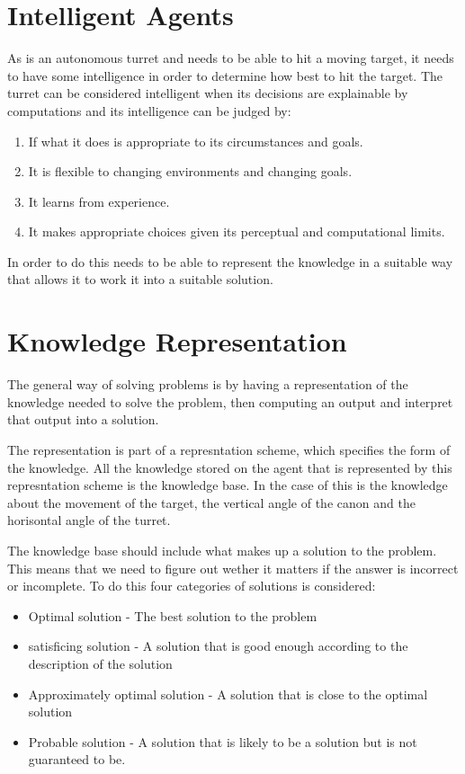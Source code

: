 \section{Intelligent Agents}

As \namep is an autonomous turret and needs to be able to hit a moving target,
it needs to have some intelligence in order to determine how best to hit the
target. The turret can be considered intelligent when its decisions
are explainable by computations and its intelligence can be judged by:

\begin{enumerate}
  \item If what it does is appropriate to its circumstances and goals.
  \item It is flexible to changing environments and changing goals.
  \item It learns from experience.
  \item It makes appropriate choices given its perceptual and computational
  limits.
\end{enumerate}

In order to do this \namep needs to be able to represent the knowledge in a
suitable way that allows it to work it into a suitable solution.


\section{Knowledge Representation}
The general way of solving problems is by having a representation of the
knowledge needed to solve the problem, then computing an output and interpret
that output into a solution.\nl

The representation is part of a represntation scheme, which specifies the form
of the knowledge. All the knowledge stored on the agent that is represented by
this represntation scheme is the knowledge base. In the case of \namep this is
the knowledge about the movement of the target, the vertical angle of the canon
and the horisontal angle of the turret.\nl

The knowledge base should include what makes up a solution to the problem. This
means that we need to figure out wether it matters if the answer is incorrect or
incomplete. To do this four categories of solutions is considered:

\begin{itemize}
  \item Optimal solution - The best solution to the problem
  \item satisficing solution - A solution that is good enough according to the
  description of the solution
  \item Approximately optimal solution - A solution that is close to the optimal
  solution
  \item Probable solution - A solution that is likely to be a solution but is
  not guaranteed to be.
\end{itemize}

